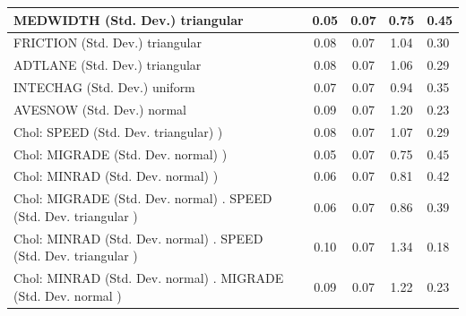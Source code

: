 \begin{table}
\begin{center}
\begin{tabular}{|l|l|c|c|c|l|}
			\hline
			MEDWIDTH (Std. Dev.) triangular &  & 0.05 & 0.07 & 0.75 & 0.45 \\
			\hline
			FRICTION (Std. Dev.) triangular &  & 0.08 & 0.07 & 1.04 & 0.30 \\
			\hline
			ADTLANE (Std. Dev.) triangular &  & 0.08 & 0.07 & 1.06 & 0.29 \\
			\hline
			INTECHAG (Std. Dev.) uniform &  & 0.07 & 0.07 & 0.94 & 0.35 \\
			\hline
			AVESNOW (Std. Dev.) normal &  & 0.09 & 0.07 & 1.20 & 0.23 \\
			\hline
			 Chol: SPEED (Std. Dev. triangular) ) &  & 0.08 & 0.07 & 1.07 & 0.29 \\
			\hline
			 Chol: MIGRADE (Std. Dev. normal) ) &  & 0.05 & 0.07 & 0.75 & 0.45 \\
			\hline
			 Chol: MINRAD (Std. Dev. normal) ) &  & 0.06 & 0.07 & 0.81 & 0.42 \\
			\hline
			 Chol: MIGRADE (Std. Dev. normal) . SPEED (Std. Dev.   triangular ) &  & 0.06 & 0.07 & 0.86 & 0.39 \\
			\hline
			 Chol: MINRAD (Std. Dev. normal) . SPEED (Std. Dev.   triangular ) &  & 0.10 & 0.07 & 1.34 & 0.18 \\
			\hline
			 Chol: MINRAD (Std. Dev. normal) . MIGRADE (Std. Dev.   normal ) &  & 0.09 & 0.07 & 1.22 & 0.23 \\
			\hline
		\end{tabular}
	\end{center}
\end{table}